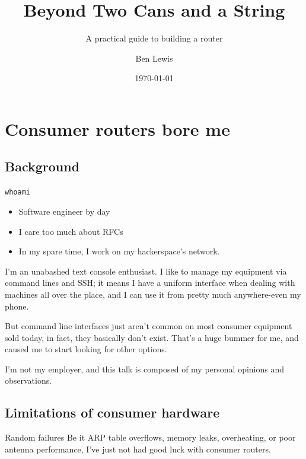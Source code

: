 \documentclass[bigger,aspectratio=169]{beamer}
\author{Ben Lewis}
\date{\today}
\title{Beyond Two Cans and a String}
\subtitle{A practical guide to building a router}
\begin{document}
\maketitle

\section{Consumer routers bore me}
\label{sec:org769d52d}

\subsection{Background}
\label{sec:orgb37081c}

\begin{frame}[fragile,label={sec:org06c16c6}]{\texttt{whoami}}
  \begin{itemize}
  \item Software engineer by day
  \item I care too much about RFCs
  \item In my spare time, I work on my hackerspace's network.
  \end{itemize}
\begin{notes}
I'm an unabashed text console enthusiast. I like to manage my equipment via
command lines and SSH; it means I have a uniform interface when dealing with
machines all over the place, and I can use it from pretty much anywhere-even my
phone.

But command line interfaces just aren't common on most consumer equipment sold
today, in fact, they basically don't exist. That's a huge bummer for me, and
caused me to start looking for other options.
\end{notes}

\end{frame}

\begin{frame}
  I'm not my employer, and this talk is composed of my personal opinions and observations.
\end{frame}

\subsection{Limitations of consumer hardware}
\label{sec:orgbbeeef6}

\begin{frame}[label={sec:org6db040a}]{Random failures}
Be it ARP table overflows, memory leaks, overheating, or poor antenna
performance, I've just not had good luck with consumer routers.
\end{frame}
\end{document}
